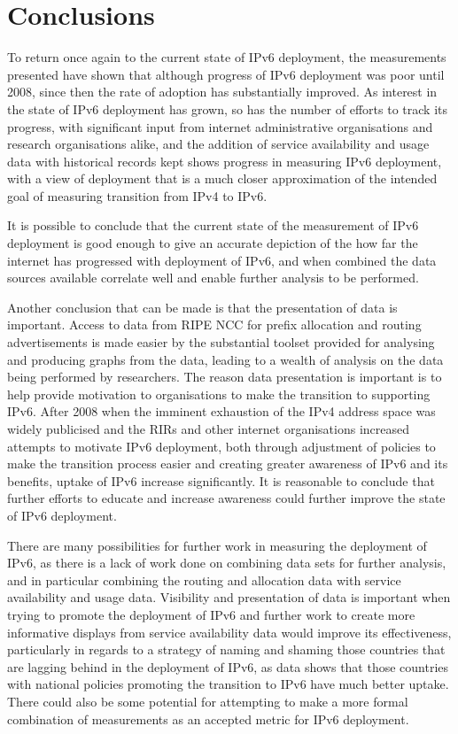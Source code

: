 \section{Conclusions}

To return once again to the current state of IPv6 deployment, the measurements
presented have shown that although progress of IPv6 deployment was poor until
2008, since then the rate of adoption has substantially improved. As interest in
the state of IPv6 deployment has grown, so has the number of efforts to track
its progress, with significant input from internet administrative organisations
and research organisations alike, and the addition of service availability and
usage data with historical records kept shows progress in measuring IPv6
deployment, with a view of deployment that is a much closer 
approximation of the intended goal of measuring transition from IPv4 to IPv6.

It is possible to conclude that the current state of the measurement of IPv6
deployment is good enough to give an accurate depiction of the how far the
internet has progressed with deployment of IPv6, and when combined the data
sources available correlate well and enable further analysis to be performed.

Another conclusion that can be made is that the presentation of data is
important. Access to data from RIPE NCC for prefix allocation and routing
advertisements is made easier by the substantial toolset provided for analysing
and producing graphs from the data, leading to a wealth of analysis on the data
being performed by researchers. The reason data presentation is important is
to help provide motivation to organisations to make the transition to supporting
IPv6. After 2008 when the imminent exhaustion of the IPv4 address space was
widely publicised and the RIRs and other internet organisations increased
attempts to motivate IPv6 deployment, both through adjustment of policies to
make the transition process easier and creating greater awareness of IPv6 and
its benefits, uptake of IPv6 increase significantly. It is reasonable to
conclude that further efforts to educate and increase awareness could further
improve the state of IPv6 deployment.

There are many possibilities for further work in measuring the deployment of
IPv6, as there is a lack of work done on combining data sets for further
analysis, and in particular combining the routing and allocation data with
service availability and usage data. Visibility and presentation of data is
important when trying to promote the deployment of IPv6 and further work to
create more informative displays from service availability data would improve
its effectiveness, particularly in regards to a strategy of naming and shaming
those countries that are lagging behind in the deployment of IPv6, as data shows
that those countries with national policies promoting the transition to IPv6
have much better uptake\cite{olivier_mj_crepin-leblond_ipv6_2011}. There could
also be some potential for
attempting to make a more formal combination of measurements as an accepted
metric for IPv6 deployment.

